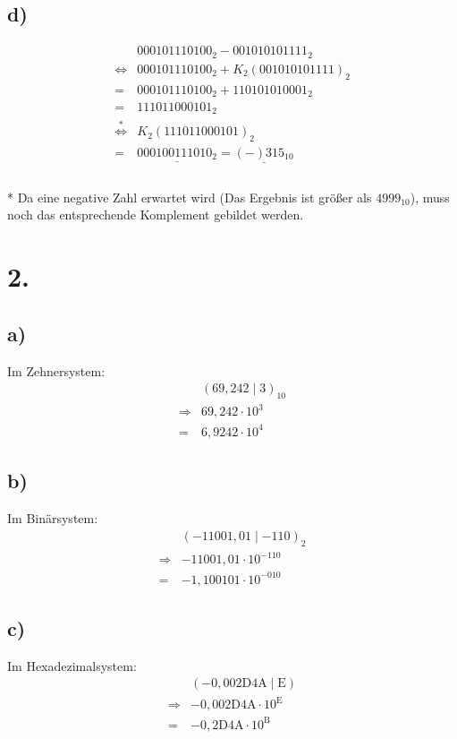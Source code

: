 \documentclass[a4paper]{scrartcl}
\begin{document}
	\subsection{d)}
	\[
	\begin{array}{cl}
		 &000101110100_2-001010101111_2 \\
		 \Leftrightarrow & 000101110100_2 + K_2(001010101111)_2 \\
		=&000101110100_2+110101010001_2 \\
		=&111011000101_2 \\	
		\overset{*}{\Leftrightarrow} & K_2(111011000101)_2 \\
		=& \underline{000100111010_2} = \underline{(-)315_{10}}\\
	\end{array}
	\] \\
	* Da eine negative Zahl erwartet wird (Das Ergebnis ist größer als \(4999_{10}\)), muss noch das 
	entsprechende Komplement gebildet werden.
	
\section{2.}
	\subsection{a)}
		Im Zehnersystem:
		\begin{align}
			 &(69,242\mid 3)_{10} \\
			\Rightarrow & 69,242\cdot 10^3\\
			=&6,9242\cdot 10^4		
		\end{align}
		
	\subsection{b)}
		Im Binärsystem:
		\begin{align}
			&(-11001,01\mid -110)_2 \\
			\Rightarrow & -11001,01\cdot 10^{-110} \\
			= & -1,100101\cdot 10^{-010}
		\end{align}
	\subsection{c)}	
		Im Hexadezimalsystem:
		\begin{align}
			&(-0,002\text{D4A}\mid \text{E}) \\
			\Rightarrow & -0,002\text{D4A} \cdot 10^\text{E} \\
			=&-0,2\text{D4A}\cdot 10^\text{B}
		\end{align}
		
\end{document}
